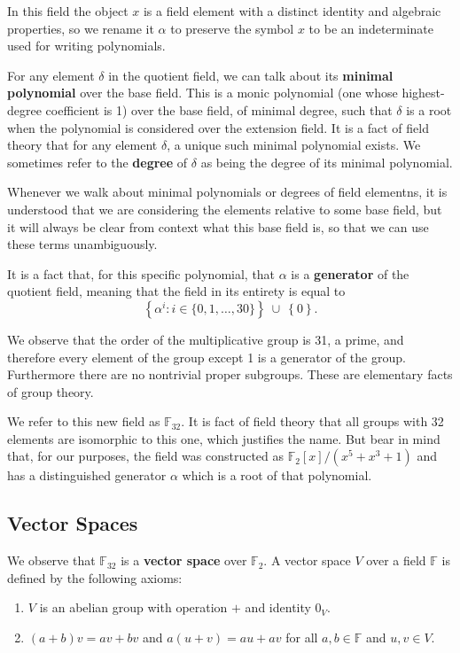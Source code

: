 \documentclass[letterpaper]{article}
\newcommand{\ftwo}{\mathbb{F}_2}
\newcommand{\fttwo}{\mathbb{F}_{32}}
\begin{document}
In this field the object $x$ is a field element with a distinct identity and
algebraic properties, so we rename it $\alpha$ to preserve the symbol $x$ to
be an indeterminate used for writing polynomials.

For any element $\delta$ in the quotient field, we can talk about its
\textbf{minimal polynomial} over the base field. This is a monic polynomial
(one whose highest-degree coefficient is 1) over the base field, of minimal
degree, such that $\delta$ is a root when the polynomial is considered over
the extension field. It is a fact of field theory that for any element
$\delta$, a unique such minimal polynomial exists. We sometimes refer to the
\textbf{degree} of $\delta$ as being the degree of its minimal polynomial.

Whenever we walk about minimal polynomials or degrees of field elementns, it
is understood that we are considering the elements relative to some base field,
but it will always be clear from context what this base field is, so that we
can use these terms unambiguously.

It is a fact that, for this specific polynomial, that $\alpha$ is a
\textbf{generator} of the quotient field, meaning that the field in its entirety
is equal to
\[ \left\{ \alpha^i : i \in \{0,1,\ldots,30\} \right\} ~\cup~ \left\{ 0 \right\}. \]

We observe that the order of the multiplicative group is 31, a prime, and therefore
every element of the group except 1 is a generator of the group. Furthermore there
are no nontrivial proper subgroups. These are elementary facts of group theory.

We refer to this new field as $\fttwo$. It is fact of field theory that all
groups with 32 elements are isomorphic to this one, which justifies the name.
But bear in mind that, for our purposes, the field was constructed as $\ftwo[x]/
(x^5 + x^3 + 1)$ and has a distinguished generator $\alpha$ which is a root
of that polynomial.

\subsection{Vector Spaces}

We observe that $\fttwo$ is a \textbf{vector space} over $\ftwo$. A vector
space $V$ over a field $\mathbb{F}$ is defined by the following axioms:

\begin{enumerate}
\item $V$ is an abelian group with operation $+$ and identity $0_V$.
\item $(a + b)v = av + bv$ and $a(u + v) = au + av$ for all $a,b\in \mathbb{F}$ and
$u,v\in V$.
\end{enumerate}
\end{document}
